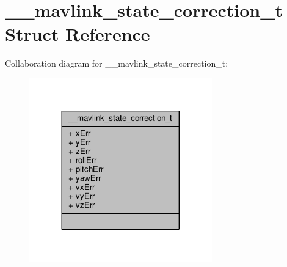 \hypertarget{struct____mavlink__state__correction__t}{\section{\+\_\+\+\_\+mavlink\+\_\+state\+\_\+correction\+\_\+t Struct Reference}
\label{struct____mavlink__state__correction__t}
}


Collaboration diagram for \+\_\+\+\_\+mavlink\+\_\+state\+\_\+correction\+\_\+t\+:
\nopagebreak
\begin{figure}[H]
\begin{center}
\leavevmode
\includegraphics[width=224pt]{struct____mavlink__state__correction__t__coll__graph}
\end{center}
\end{figure}
